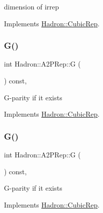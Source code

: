 dimension of irrep 

Implements \mbox{\hyperlink{structHadron_1_1CubicRep_ac178d14064f037a66af4b9fb4b312d51}{Hadron\+::\+Cubic\+Rep}}.

\mbox{\label{structHadron_1_1A2PRep_a5011ad34ac95356b12a9da490244e399}} 
\subsubsection{\texorpdfstring{G()}{G()}\hspace{0.1cm}{\footnotesize\ttfamily [1/2]}}
{\footnotesize\ttfamily int Hadron\+::\+A2\+P\+Rep\+::G (\begin{DoxyParamCaption}{ }\end{DoxyParamCaption}) const\hspace{0.3cm}{\ttfamily [inline]}, {\ttfamily [virtual]}}

G-\/parity if it exists 

Implements \mbox{\hyperlink{structHadron_1_1CubicRep_a52104e43266d1614c00bbd1c3b395458}{Hadron\+::\+Cubic\+Rep}}.

\mbox{\label{structHadron_1_1A2PRep_a5011ad34ac95356b12a9da490244e399}} 
\subsubsection{\texorpdfstring{G()}{G()}\hspace{0.1cm}{\footnotesize\ttfamily [2/2]}}
{\footnotesize\ttfamily int Hadron\+::\+A2\+P\+Rep\+::G (\begin{DoxyParamCaption}{ }\end{DoxyParamCaption}) const\hspace{0.3cm}{\ttfamily [inline]}, {\ttfamily [virtual]}}

G-\/parity if it exists 

Implements \mbox{\hyperlink{structHadron_1_1CubicRep_a52104e43266d1614c00bbd1c3b395458}{Hadron\+::\+Cubic\+Rep}}.

\mbox{\label{structHadron_1_1A2PRep_accbc36395d6c73bf53f8914b3219f902}} 
